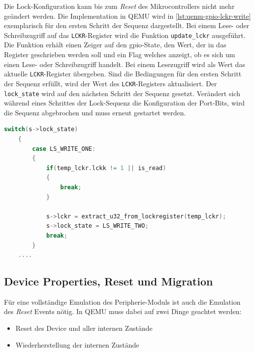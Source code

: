 Die Lock-Konfiguration kann bis zum \textit{Reset} des Mikrocontrollers
nicht mehr geändert werden.
\newline
Die Implementation in QEMU wird in \ref{lst:qemu-gpio-lckr-write} exemplarisch
für den ersten Schritt der Sequenz dargestellt.
Bei einem Lese- oder Schreibzugriff auf das \texttt{LCKR}-Register wird die
Funktion \texttt{update\_lckr} ausgeführt.
Die Funktion erhält einen Zeiger auf den \ac{gpio}-State, den Wert, der in das
Register geschrieben werden soll und ein Flag welches anzeigt, ob es sich um
einen Lese- oder Schreibzugriff handelt.
Bei einem Lesezugriff wird als Wert das aktuelle \texttt{LCKR}-Register
übergeben.
Sind die Bedingungen für den ersten Schritt der Sequenz erfüllt, wird der Wert
des \texttt{LCKR}-Registers aktualisiert.
Der \texttt{lock\_state} wird auf den nächsten Schritt der Sequenz gesetzt.
Verändert sich während eines Schrittes der Lock-Sequenz die Konfiguration der
Port-Bits, wird die Sequenz abgebrochen und muss erneut gestartet werden.

\begin{minipage}{\linewidth}
\begin{lstlisting}[language=c,numbers=none,
                label={lst:qemu-gpio-lckr-write},
                caption=\texttt{update\_lckr} Funktion mit Implementation des
                    ersten Schreibzugriffes auf das \texttt{LCKR}-Registers]
    switch(s->lock_state)
    {
        case LS_WRITE_ONE:
        {
            if(temp_lckr.lckk != 1 || is_read)
            {
                break;
            }

            s->lckr = extract_u32_from_lockregister(temp_lckr);
            s->lock_state = LS_WRITE_TWO;
            break;
        }
    ....
\end{lstlisting}
\end{minipage}

\subsection{Device Properties, Reset und Migration}
\label{sec:impl-qemu-reset}

Für eine vollständige Emulation des Peripherie-Moduls ist auch die Emulation
des \textit{Reset} Events nötig.
In QEMU muss dabei auf zwei Dinge geachtet werden:
\begin{itemize}
    \item Reset des Device und aller internen Zustände
    \item Wiederherstellung der internen Zustände
\end{itemize}

